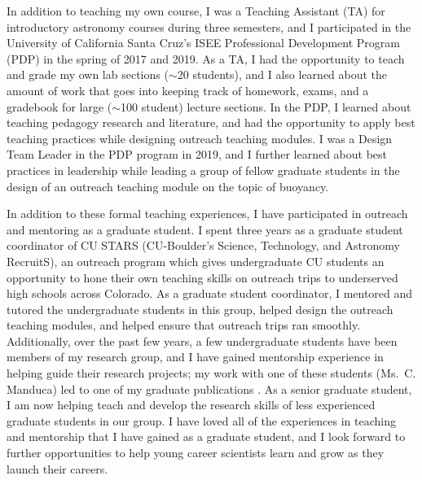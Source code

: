 \documentclass[onecolumn, 11pt, hmargin=1in, vmargin=1in]{aastex62}
\begin{document}
In addition to teaching my own course, I was a Teaching Assistant (TA) for introductory astronomy courses during three semesters, and I participated in the University of California Santa Cruz's ISEE Professional Development Program (PDP) in the spring of 2017 and 2019.
As a TA, I had the opportunity to teach and grade my own lab sections ($\sim$20 students), and I also learned about the amount of work that goes into keeping track of homework, exams, and a gradebook for large ($\sim$100 student) lecture sections.
In the PDP, I learned about teaching pedagogy research and literature, and had the opportunity to apply best teaching practices while designing outreach teaching modules.
I was a Design Team Leader in the PDP program in 2019, and I further learned about best practices in leadership while leading a group of fellow graduate students in the design of an outreach teaching module on the topic of buoyancy.

In addition to these formal teaching experiences, I have participated in outreach and mentoring as a graduate student.
I spent three years as a graduate student coordinator of CU STARS (CU-Boulder's Science, Technology, and Astronomy RecruitS), an outreach program which gives undergraduate CU students an opportunity to hone their own teaching skills on outreach trips to underserved high schools across Colorado.
As a graduate student coordinator, I mentored and tutored the undergraduate students in this group, helped design the outreach teaching modules, and helped ensure that outreach trips ran smoothly.
Additionally, over the past few years, a few undergraduate students have been members of my research group, and I have gained mentorship experience in helping guide their research projects; my work with one of these students (Ms.~C. Manduca) led to one of my graduate publications \citep{anders&all2019}.
As a senior graduate student, I am now helping teach and develop the research skills of less experienced graduate students in our group.
I have loved all of the experiences in teaching and mentorship that I have gained as a graduate student, and I look forward to further opportunities to help young career scientists learn and grow as they launch their careers.
\end{document}
